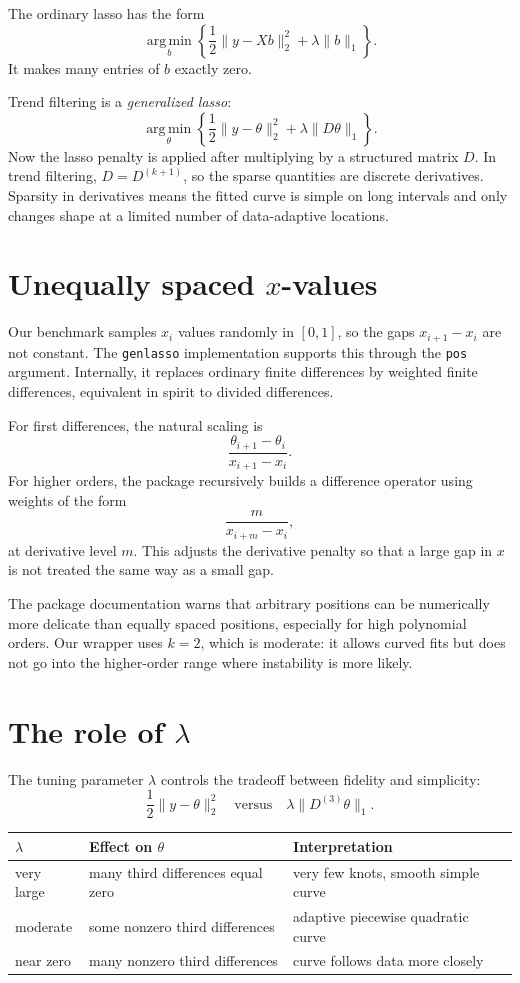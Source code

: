 \documentclass[11pt]{article}
\newcommand{\argmin}{\operatorname*{arg\,min}}
\begin{document}
The ordinary lasso has the form
\[
\argmin_b
\left\{
\frac{1}{2}\|y-Xb\|_2^2+\lambda\|b\|_1
\right\}.
\]
It makes many entries of \(b\) exactly zero.

Trend filtering is a \emph{generalized lasso}:
\[
\argmin_{\theta}
\left\{
\frac{1}{2}\|y-\theta\|_2^2+\lambda\|D\theta\|_1
\right\}.
\]
Now the lasso penalty is applied after multiplying by a structured matrix
\(D\). In trend filtering, \(D=D^{(k+1)}\), so the sparse quantities are
discrete derivatives. Sparsity in derivatives means the fitted curve is simple
on long intervals and only changes shape at a limited number of data-adaptive
locations.

\section{Unequally spaced \(x\)-values}

Our benchmark samples \(x_i\) values randomly in \([0,1]\), so the gaps
\(x_{i+1}-x_i\) are not constant. The \texttt{genlasso} implementation supports
this through the \texttt{pos} argument. Internally, it replaces ordinary finite
differences by weighted finite differences, equivalent in spirit to divided
differences.

For first differences, the natural scaling is
\[
\frac{\theta_{i+1}-\theta_i}{x_{i+1}-x_i}.
\]
For higher orders, the package recursively builds a difference operator using
weights of the form
\[
\frac{m}{x_{i+m}-x_i},
\]
at derivative level \(m\). This adjusts the derivative penalty so that a large
gap in \(x\) is not treated the same way as a small gap.

The package documentation warns that arbitrary positions can be numerically
more delicate than equally spaced positions, especially for high polynomial
orders. Our wrapper uses \(k=2\), which is moderate: it allows curved fits but
does not go into the higher-order range where instability is more likely.

\section{The role of \(\lambda\)}

The tuning parameter \(\lambda\) controls the tradeoff between fidelity and
simplicity:
\[
\frac{1}{2}\|y-\theta\|_2^2
\quad\text{versus}\quad
\lambda\|D^{(3)}\theta\|_1.
\]

\begin{center}
\begin{tabular}{lll}
\toprule
\(\lambda\) & Effect on \(\theta\) & Interpretation\\
\midrule
very large & many third differences equal zero & very few knots, smooth simple curve\\
moderate & some nonzero third differences & adaptive piecewise quadratic curve\\
near zero & many nonzero third differences & curve follows data more closely\\
\bottomrule
\end{tabular}
\end{center}
\end{document}
